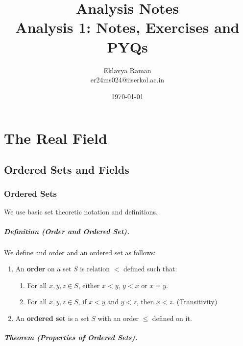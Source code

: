 \documentclass[openany]{book}
\numberwithin{equation}{section}
\begin{document}
\title{\Large{\textbf{Analysis Notes}} \\ \vspace{5pt}
\large{Analysis 1: Notes, Exercises and PYQs}}
\author{Eklavya Raman \\ \vspace{5pt} er24ms024@iiserkol.ac.in \\ \vspace{5pt}}
\date{\today}
\maketitle
\tableofcontents
\chapter{The Real Field}
\section{Ordered Sets and Fields}
\subsection{Ordered Sets}
We use basic set theoretic notation and definitions.
\paragraph{Definition (Order and Ordered Set).}

    We define and order and an ordered set as follows:
    \begin{enumerate}
    \item An \textbf{order} on a set $S$ is relation $<$ defined such that:
    \begin{enumerate}
        \item For all $x, y, z \in S$, either $x < y$, $y < x$ or $x = y$.
        \item For all $x, y, z \in S$, if $x < y$ and $y < z$, then $x < z$. (Transitivity)
    \end{enumerate}
    \item An \textbf{ordered set} is a set $S$ with an order $\leq$ defined on it.
    \end{enumerate}
\par
\paragraph{Theorem (Properties of Ordered Sets).}
\end{document}
